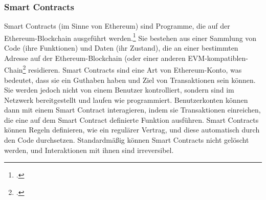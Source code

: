 \subsubsection{Smart Contracts}
\label{sec:definition-smart-contracts}

Smart Contracts (im Sinne von Ethereum) sind Programme, die auf der Ethereum-Blockchain ausgeführt werden.\footcite[Vgl. hierzu und im Folgenden][]{w4} Sie bestehen aus einer Sammlung von Code (ihre Funktionen) und Daten (ihr Zustand), die an einer bestimmten Adresse auf der Ethereum-Blockchain (oder einer anderen EVM-kompatiblen-Chain\footcite[Vgl.][]{w5}
 residieren. Smart Contracts sind eine Art von Ethereum-Konto, was bedeutet, dass sie ein Guthaben haben und Ziel von Transaktionen sein können. Sie werden jedoch nicht von einem Benutzer kontrolliert, sondern sind im Netzwerk bereitgestellt und laufen wie programmiert. Benutzerkonten können dann mit einem Smart Contract interagieren, indem sie Transaktionen einreichen, die eine auf dem Smart Contract definierte Funktion ausführen. 
Smart Contracts können Regeln definieren, wie ein regulärer Vertrag, und diese automatisch durch den Code durchsetzen. Standardmäßig können Smart Contracts nicht gelöscht werden, und Interaktionen mit ihnen sind irreversibel.

